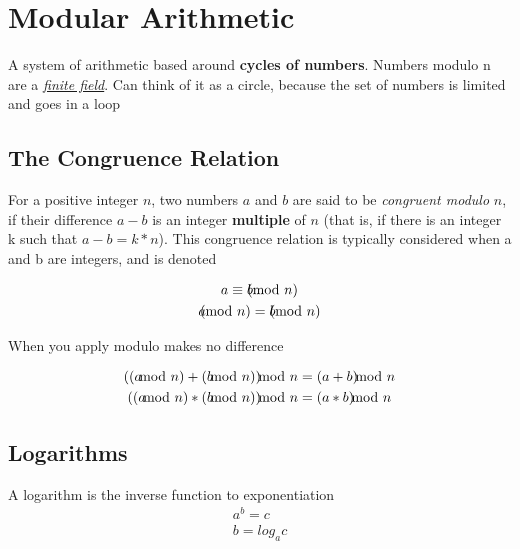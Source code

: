 \documentclass{article}
\newcommand{\worddef}[1]{\hyperref[sec:reference]{\textit{#1}}}
\begin{document}
\section{Modular Arithmetic}
\begin{flushleft}
A system of arithmetic based around \textbf{cycles of numbers}. Numbers modulo n are a \worddef{finite field}. Can think of it as a circle, because the set of numbers is limited and goes in a loop
\end{flushleft}

\subsection{The Congruence Relation}

\begin{flushleft}
For a positive integer $n$, two numbers $a$ and $b$ are said to be \textit{congruent modulo} $n$, if their difference $a - b$ is an integer \textbf{multiple} of $n$ (that is, if there is an integer k such that $a − b = k*n$). This congruence relation is typically considered when a and b are integers, and is denoted
\end{flushleft} 
\begin{gather}
  a\equiv b \kern-0.3cm \pmod{n} \\
  a \kern-0.3cm \pmod{n} = b \kern-0.3cm \pmod{n}
\end{gather}

\begin{flushleft}
When you apply modulo makes no difference
\end{flushleft}
\begin{gather}
  ((a \kern-0.3cm \mod{n}) + (b \kern-0.3cm \mod{n})) \kern-0.3cm \mod{n} = (a + b) \kern-0.3cm \mod{n} \\
   ((a \kern-0.3cm \mod{n}) * (b \kern-0.3cm \mod{n})) \kern-0.3cm \mod{n} = (a * b) \kern-0.3cm \mod{n}
\end{gather}

\pagebreak

\subsection{Logarithms}
\begin{flushleft}
A logarithm is the inverse function to exponentiation
\begin{gather}
   a^{b} = c \\
   b = log_a c
\end{gather}
\end{flushleft}
\end{document}
